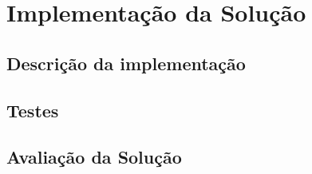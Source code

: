 \chapter{Implementação da Solução}
\label{sec:4-Implementacao}


\section{Descrição da implementação}


\section{Testes}


\section{Avaliação da Solução}
